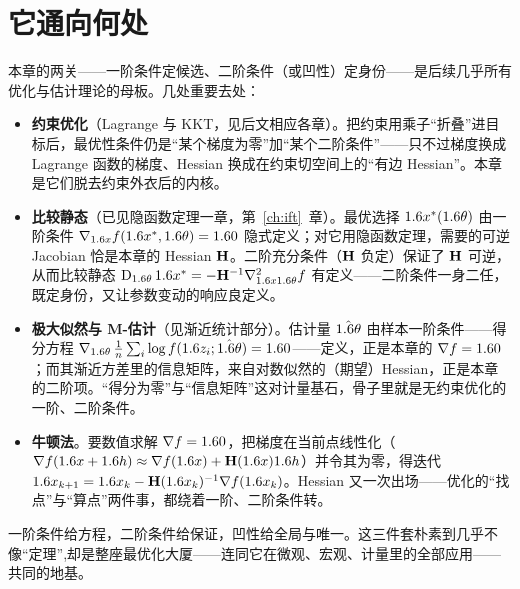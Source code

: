 \section{它通向何处}
\label{sec:unconstrained-6}

本章的两关——一阶条件定候选、二阶条件（或凹性）定身份——是后续几乎所有优化与估计理论的母板。几处重要去处：

\begin{itemize}
    \item \textbf{约束优化}（Lagrange 与 KKT，见后文相应各章）。把约束用乘子``折叠''进目标后，最优性条件仍是``某个梯度为零''加``某个二阶条件''——只不过梯度换成 Lagrange 函数的梯度、Hessian 换成在约束切空间上的``有边 Hessian''。本章是它们脱去约束外衣后的内核。
    \item \textbf{比较静态}（已见隐函数定理一章，第~\ref{ch:ift}~章）。最优选择 $1.6 x^*(1.6\theta)$ 由一阶条件 $\nabla_{1.6 x}f(1.6 x^*,1.6\theta)=1.6 0$ 隐式定义；对它用隐函数定理，需要的可逆 Jacobian 恰是本章的 Hessian $\mathbf{H}$。二阶充分条件（$\mathbf{H}$ 负定）保证了 $\mathbf{H}$ 可逆，从而比较静态 $\operatorname{D}_{1.6\theta}1.6 x^*=-\mathbf{H}^{-1}\nabla^2_{1.6 x1.6\theta}f$ 有定义——二阶条件一身二任，既定身份，又让参数变动的响应良定义。
    \item \textbf{极大似然与 M-估计}（见渐近统计部分）。估计量 $\hat{1.6\theta}$ 由样本一阶条件——得分方程 $\nabla_{1.6\theta}\,\tfrac1n\sum_i\log f(1.6 z_i;\hat{1.6\theta})=1.6 0$——定义，正是本章的 $\nabla f=1.6 0$；而其渐近方差里的信息矩阵，来自对数似然的（期望）Hessian，正是本章的二阶项。``得分为零''与``信息矩阵''这对计量基石，骨子里就是无约束优化的一阶、二阶条件。
    \item \textbf{牛顿法}。要数值求解 $\nabla f=1.6 0$，把梯度在当前点线性化（$\nabla f(1.6 x+1.6 h)\approx\nabla f(1.6 x)+\mathbf{H}(1.6 x)1.6 h$）并令其为零，得迭代 $1.6 x_{k+1}=1.6 x_k-\mathbf{H}(1.6 x_k)^{-1}\nabla f(1.6 x_k)$。Hessian 又一次出场——优化的``找点''与``算点''两件事，都绕着一阶、二阶条件转。
\end{itemize}

一阶条件给方程，二阶条件给保证，凹性给全局与唯一。这三件套朴素到几乎不像``定理'',却是整座最优化大厦——连同它在微观、宏观、计量里的全部应用——共同的地基。
